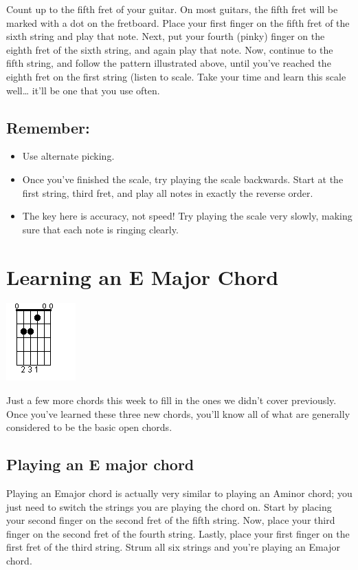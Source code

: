 Count up to the fifth fret of your guitar. On most guitars, the fifth fret will
be marked with a dot on the fretboard. Place your first finger on the fifth
fret of the sixth string and play that note. Next, put your fourth (pinky)
finger on the eighth fret of the sixth string, and again play that note. Now,
continue to the fifth string, and follow the pattern illustrated above, until
you've reached the eighth fret on the first string (listen to scale. Take your
time and learn this scale well\ldots{} it'll be one that you use often.

\subsection{Remember:}
\begin{itemize}
\item Use alternate picking.
\item Once you've finished the scale, try playing the scale backwards. Start at
      the first string, third fret, and play all notes in exactly the reverse order.
\item The key here is accuracy, not speed! Try playing the scale very slowly,
      making sure that each note is ringing clearly.
\end{itemize}

\section{Learning an E Major Chord}
\includegraphics{partthree/openemajor.png}

Just a few more chords this week to fill in the ones we didn't cover
previously. Once you've learned these three new chords, you'll know all of what
are generally considered to be the basic open chords.

\subsection{Playing an E major chord}

Playing an Emajor chord is actually very similar to playing an Aminor chord;
you just need to switch the strings you are playing the chord on. Start by
placing your second finger on the second fret of the fifth string. Now, place
your third finger on the second fret of the fourth string. Lastly, place your
first finger on the first fret of the third string. Strum all six strings and
you're playing an Emajor chord.


